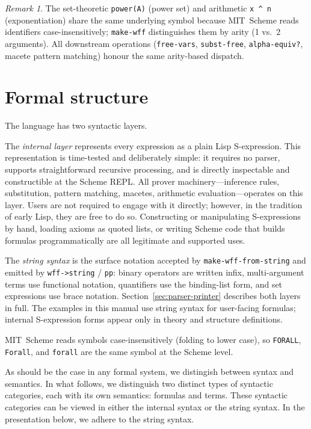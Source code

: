 \documentclass{amsbook}[openany]
\theoremstyle{definition}
\theoremstyle{remark}
\newtheorem{remark}{Remark}[chapter]
\theoremstyle{remark}
\begin{document}
%
\begin{remark}\label{remark:27135-34761-138906}
%
The set-theoretic \texttt{power(A)} (power set) and arithmetic
\texttt{x \^{} n} (exponentiation) share the same underlying symbol because
MIT~Scheme reads identifiers case-insensitively; \texttt{make-wff}
distinguishes them by arity (1 vs.\ 2 arguments).  All downstream
operations (\texttt{free-vars}, \texttt{subst-free},
\texttt{alpha-equiv?}, macete pattern matching) honour the same
arity-based dispatch.

%
\end{remark}

\chapter{Formal structure}
\label{sec:language}

The language has two syntactic layers.

The \emph{internal layer} represents every expression as a plain
Lisp S-expression.  This representation is time-tested and deliberately
simple: it requires no parser, supports straightforward recursive
processing, and is directly inspectable and constructible at the Scheme
REPL.  All prover machinery---inference rules, substitution, pattern
matching, macetes, arithmetic evaluation---operates on this layer.
Users are not required to engage with it directly; however, in the
tradition of early Lisp, they are free to do so.  Constructing or
manipulating S-expressions by hand, loading axioms as quoted lists,
or writing Scheme code that builds formulas programmatically are all
legitimate and supported uses.

The \emph{string syntax} is the surface notation accepted by
\texttt{make-wff-from-string} and emitted by \texttt{wff->string}
/ \texttt{pp}: binary operators are written infix, multi-argument
terms use functional notation, quantifiers use the binding-list form,
and set expressions use brace notation.
Section~\ref{sec:parser-printer} describes both layers in full.
The examples in this manual use string syntax for user-facing
formulas; internal S-expression forms appear only in theory and
structure definitions.

MIT~Scheme reads symbols case-insensitively (folding to lower case),
so \texttt{FORALL}, \texttt{Forall}, and \texttt{forall} are the same
symbol at the Scheme level.

As should be the case in any formal system, we distingish between
syntax and semantics. In what follows, we distinguish two distinct
types of syntactic categories, each with its own semantics: formulas
and terms. These syntactic categories can be viewed in either the
internal syntax or the string syntax. In the presentation below, we
adhere to the string syntax.
\end{document}
